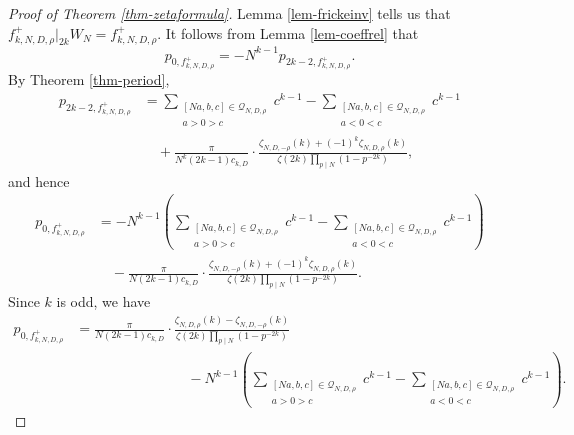 \documentclass[12pt]{amsart}
\numberwithin{equation}{section}
\theoremstyle{definition}
\begin{document}
\begin{proof}[Proof of Theorem \ref{thm-zetaformula}]
    Lemma \ref{lem-frickeinv} tells us that $f_{k,N,D,\rho}^{+}|_{2k}W_{N}=f_{k,N,D,\rho}^{+}$. It follows from Lemma \ref{lem-coeffrel} that
    $$p_{0,f_{k,N,D,\rho}^{+}}=-N^{k-1}p_{2k-2,f_{k,N,D,\rho}^{+}}.$$
    By Theorem \ref{thm-period},
    \begin{align*}
        p_{2k-2,f_{k,N,D,\rho}^{+}}&=\sum\limits_{\substack{[Na,b,c]\in\mathcal{Q}_{N,D,\rho} \\ a>0>c}}c^{k-1}-\sum\limits_{\substack{[Na,b,c]\in\mathcal{Q}_{N,D,\rho} \\ a<0<c}}c^{k-1}\\
        &\quad+\frac{\pi}{N^{k}(2k-1)c_{k,D}}\cdot\frac{\zeta_{N,D,-\rho}(k)+(-1)^{k}\zeta_{N,D,\rho}(k)}{\zeta(2k)\prod_{p\mid N}(1-p^{-2k})},
    \end{align*}
    and hence
    \begin{align*}
        p_{0,f_{k,N,D,\rho}^{+}}&=-N^{k-1}\left(\sum\limits_{\substack{[Na,b,c]\in\mathcal{Q}_{N,D,\rho} \\ a>0>c}}c^{k-1}-\sum\limits_{\substack{[Na,b,c]\in\mathcal{Q}_{N,D,\rho} \\ a<0<c}}c^{k-1}\right)\\
            &\quad-\frac{\pi}{N(2k-1)c_{k,D}}\cdot\frac{\zeta_{N,D,-\rho}(k)+(-1)^{k}\zeta_{N,D,\rho}(k)}{\zeta(2k)\prod_{p\mid N}(1-p^{-2k})}.
    \end{align*}
    Since $k$ is odd, we have
    \begin{equation}\label{eq-firstleading}
        \begin{split}
            p_{0,f_{k,N,D,\rho}^{+}}&=\frac{\pi}{N(2k-1)c_{k,D}}\cdot\frac{\zeta_{N,D,\rho}(k)-\zeta_{N,D,-\rho}(k)}{\zeta(2k)\prod_{p\mid N}(1-p^{-2k})}\\
            &\qquad\qquad\qquad\qquad-N^{k-1}\left(\sum\limits_{\substack{[Na,b,c]\in\mathcal{Q}_{N,D,\rho} \\ a>0>c}}c^{k-1}-\sum\limits_{\substack{[Na,b,c]\in\mathcal{Q}_{N,D,\rho} \\ a<0<c}}c^{k-1}\right).
        \end{split}
    \end{equation}
    

\end{proof}
\end{document}
